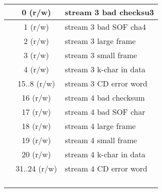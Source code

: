 \documentclass[landscape,margin=3pt,pstricks]{standalone}
\begin{document}
\begin{tabular}{|c|c|*{32}{c|}}
 & 0 (r/w) &  \multicolumn{32}{|l|}{stream 3 bad checksu3} \\ \hline
 & 1 (r/w) &  \multicolumn{32}{|l|}{stream 3 bad SOF cha4} \\ \hline
 & 2 (r/w) &  \multicolumn{32}{|l|}{stream 3 large frame} \\ \hline
 & 3 (r/w) &  \multicolumn{32}{|l|}{stream 3 small frame} \\ \hline
 & 4 (r/w) &  \multicolumn{32}{|l|}{stream 3 k-char in data} \\ \hline
 & 15..8 (r/w) &  \multicolumn{32}{|l|}{stream 3 CD error word} \\ \hline
 & 16 (r/w) &  \multicolumn{32}{|l|}{stream 4 bad checksum} \\ \hline
 & 17 (r/w) &  \multicolumn{32}{|l|}{stream 4 bad SOF char} \\ \hline
 & 18 (r/w) &  \multicolumn{32}{|l|}{stream 4 large frame} \\ \hline
 & 19 (r/w) &  \multicolumn{32}{|l|}{stream 4 small frame} \\ \hline
 & 20 (r/w) &  \multicolumn{32}{|l|}{stream 4 k-char in data} \\ \hline
 & 31..24 (r/w) &  \multicolumn{32}{|l|}{stream 4 CD error word} \\ \hline
 &  &  \multicolumn{32}{|l|}{} \\ \hline
 &  &  \multicolumn{32}{|l|}{} \\ \hline
 &  &  \multicolumn{32}{|l|}{} \\ \hline
 &  &  \multicolumn{32}{|l|}{} \\ \hline
  \hline
\end{tabular}
\end{document}
